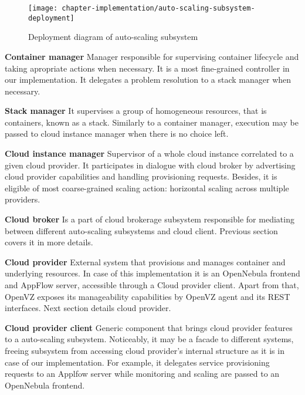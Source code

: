 \begin{figure}[!ht]
  \begin{center}
    \texttt{[image: chapter-implementation/auto-scaling-subsystem-deployment]}
  \end{center}
  \caption{Deployment diagram of auto-scaling subsystem}
  \label{fig:auto-scaling-subsystem-deployment}
\end{figure}

\begin{asparaenum}
 \item[\textbf{Container manager}] Manager responsible for supervising container lifecycle and taking apropriate actions when necessary. It is a most fine-grained controller in our implementation. It delegates a problem resolution to a stack manager when necessary.
 
 \item[\textbf{Stack manager}] It supervises a group of homogeneous resources, that is containers, known as a stack. Similarly to a container manager, execution may be passed to cloud instance manager when there is no choice left.
 
 \item[\textbf{Cloud instance manager}] Supervisor of a whole cloud instance correlated to a given cloud provider. It participates in dialogue with cloud broker by advertising cloud provider capabilities and handling provisioning requests. Besides, it is eligible of most coarse-grained scaling action: horizontal scaling across multiple providers.
 
 \item[\textbf{Cloud broker}] Is a part of cloud brokerage subsystem responsible for mediating between different auto-scaling subsystems and cloud client. Previous section covers it in more details.
 
 \item[\textbf{Cloud provider}] External system that provisions and manages container and underlying resources. In case of this implementation it is an OpenNebula frontend and AppFlow server, accessible through a Cloud provider client. Apart from that, OpenVZ exposes its manageability capabilities by OpenVZ agent and its REST interfaces. Next section details cloud provider.
 
 \item[\textbf{Cloud provider client}] Generic component that brings cloud provider features to a auto-scaling subsystem. Noticeably, it may be a facade to different systems, freeing subsystem from accessing cloud provider's internal structure as it is in case of our implementation. For example, it delegates service provisioning requests to an Applfow server while monitoring and scaling are passed to an OpenNebula frontend.
\end{asparaenum}


